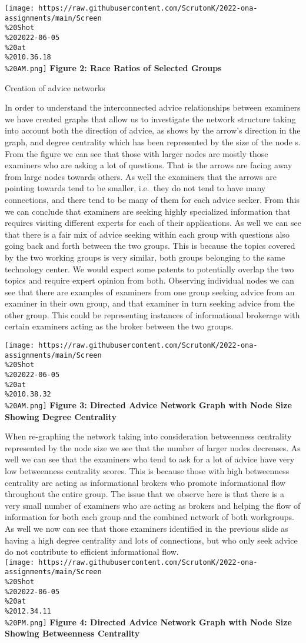 \documentclass[
]{article}
\begin{document}
\texttt{[image: https://raw.githubusercontent.com/ScrutonK/2022-ona-assignments/main/Screen\\\%20Shot\\\%202022-06-05\\\%20at\\\%2010.36.18\\\%20AM.png]}
\textbf{Figure 2: Race Ratios of Selected Groups}

Creation of advice networks

In order to understand the interconnected advice relationships between
examiners we have created graphs that allow us to investigate the
network structure taking into account both the direction of advice, as
shows by the arrow's direction in the graph, and degree centrality which
has been represented by the size of the node s. From the figure we can
see that those with larger nodes are mostly those examiners who are
asking a lot of questions. That is the arrows are facing away from large
nodes towards others. As well the examiners that the arrows are pointing
towards tend to be smaller, i.e.~they do not tend to have many
connections, and there tend to be many of them for each advice seeker.
From this we can conclude that examiners are seeking highly specialized
information that requires visiting different experts for each of their
applications. As well we can see that there is a fair mix of advice
seeking within each group with questions also going back and forth
between the two groups. This is because the topics covered by the two
working groups is very similar, both groups belonging to the same
technology center. We would expect some patents to potentially overlap
the two topics and require expert opinion from both. Observing
individual nodes we can see that there are examples of examiners from
one group seeking advice from an examiner in their own group, and that
examiner in turn seeking advice from the other group. This could be
representing instances of informational brokerage with certain examiners
acting as the broker between the two groups.

\texttt{[image: https://raw.githubusercontent.com/ScrutonK/2022-ona-assignments/main/Screen\\\%20Shot\\\%202022-06-05\\\%20at\\\%2010.38.32\\\%20AM.png]}
\textbf{Figure 3: Directed Advice Network Graph with Node Size Showing
Degree Centrality}

When re-graphing the network taking into consideration betweenness
centrality represented by the node size we see that the number of larger
nodes decreases. As well we can see that the examiners who tend to ask
for a lot of advice have very low betweenness centrality scores. This is
because those with high betweenness centrality are acting as
informational brokers who promote informational flow throughout the
entire group. The issue that we observe here is that there is a very
small number of examiners who are acting as brokers and helping the flow
of information for both each group and the combined network of both
workgroups. As well we now can see that those examiners identified in
the previous slide as having a high degree centrality and lots of
connections, but who only seek advice do not contribute to efficient
informational flow.\\
\texttt{[image: https://raw.githubusercontent.com/ScrutonK/2022-ona-assignments/main/Screen\\\%20Shot\\\%202022-06-05\\\%20at\\\%2012.34.11\\\%20PM.png]}
\textbf{Figure 4: Directed Advice Network Graph with Node Size Showing
Betweenness Centrality}
\end{document}
